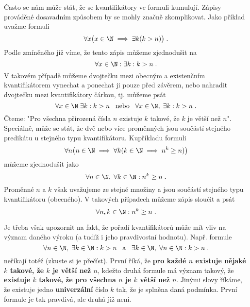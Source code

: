 Často se nám může stát, že se kvantifikátory ve formuli kumulují. Zápisy prováděné dosavadním způsobem by se mohly značně zkomplikovat. Jako příklad uvažme formuli
\begin{equation*}
    \forall x \big(x \in \N \implies \exists k (k > n)\big)\; .
\end{equation*}
Podle zmíněného již víme, že tento zápis můžeme zjednodušit na
\begin{equation*}
    \forall x \in \N : \exists k : k > n\; .
\end{equation*}
V takovém případě můžeme dvojtečku mezi obecným a existenčním kvantifikátorem vynechat a ponechat ji pouze před závěrem, nebo nahradit dvojtečku mezi kvantifikátory čárkou, tj. můžeme psát
\begin{equation*}
    \forall x \in \N\;\exists k : k > n\;\;\;\text{nebo}\;\;\;\forall x \in \N ,\;\exists k : k > n\; .
\end{equation*}
Čteme: "Pro všechna přirozená čísla $n$ existuje $k$ takové, že $k$ je větší než $n$". Speciálně, může se stát, že dvě nebo více proměnných jsou součástí stejného predikátu u stejného typu kvantifikátoru. Kupříkladu formuli
\begin{equation*}
    \forall n \big(n\in\N \implies \forall k(k\in\N \implies n^k \geq n)\big)
\end{equation*}
můžeme zjednodušit jako
\begin{equation*}
    \forall n\in\N ,\; \forall k\in\N : n^k\geq n\; .
\end{equation*}
Proměnné $n$ a $k$ však uvažujeme ze stejné množiny a jsou součástí stejného typu kvantifikátoru (obecného). V takových případech můžeme zápis sloučit a psát
\begin{equation*}
    \forall n,k\in\N : n^k\geq n\; .
\end{equation*}

Je třeba však upozornit na fakt, že pořadí kvantifikátorů může mít vliv na význam daného výroku (a tudíž i jeho pravdivostní hodnotu). Např. formule
\begin{equation*}
    \forall n\in\N,\; \exists k\in\N : k > n\;\;\;\text{a}\;\;\;\exists k\in\N,\;\forall n\in\N : k > n\; .
\end{equation*}
neříkají totéž (zkuste si je přečíst). První říká, že \textbf{pro každé $n$ existuje nějaké $k$ takové, že $k$ je větší než $n$}, kdežto druhá formule má význam takový, že \textbf{existuje $k$ takové, že pro všechna $n$ je $k$ větší než $n$}. Jinými slovy říkáme, že existuje jedno \textbf{univerzální} číslo $k$ tak, že je splněna daná podmínka. První formule je tak pravdivá, ale druhá již není.

